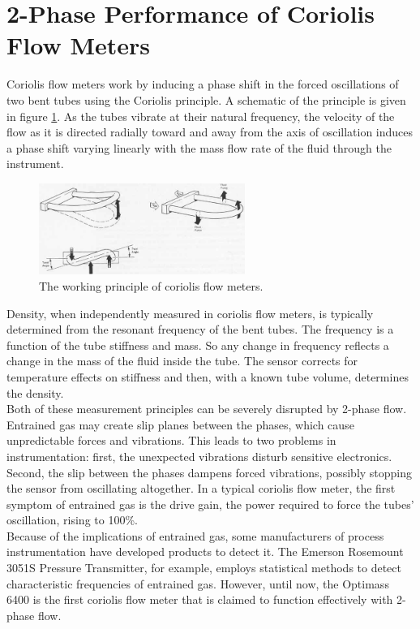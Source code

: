 \documentclass{report}
\begin{document}
\section{2-Phase Performance of Coriolis Flow Meters}
\FloatBarrier
Coriolis flow meters work by inducing a phase shift in the forced oscillations of two bent tubes using the Coriolis principle. A schematic of the principle is given in figure \ref{fig:coriolis}. As the tubes vibrate at their natural frequency, the velocity of the flow as it is directed radially toward and away from the axis of oscillation induces a phase shift varying linearly with the mass flow rate of the fluid through the instrument. \cite{ISO}\cite{O'Banion 2013}  \\
\begin{figure}
\includegraphics[width=0.6\textwidth]{coriolis}
\caption{The working principle of coriolis flow meters.}%
\label{fig:coriolis}
\end{figure}
\FloatBarrier
Density, when independently measured in coriolis flow meters, is typically determined from the resonant frequency of the bent tubes. \cite{ISO}\cite{O'Banion 2013} The frequency is a function of the tube stiffness and mass. So any change in frequency reflects a change in the mass of the fluid inside the tube. The sensor corrects for temperature effects on stiffness and then, with a known tube volume, determines the density. \cite{ISO}\\
Both of these measurement principles can be severely disrupted by 2-phase flow. Entrained gas may create slip planes between the phases, which cause unpredictable forces and vibrations.\cite{ISO}\cite{processArticle}\cite{emerson2Phase} This leads to two problems in instrumentation: first, the unexpected vibrations disturb sensitive electronics. Second, the slip between the phases dampens forced vibrations, possibly stopping the sensor from oscillating altogether. In a typical coriolis flow meter, the first symptom of entrained gas is the drive gain, the power required to force the tubes' oscillation, rising to 100\%. \cite{ISO}\cite{emerson youtube}\\
Because of the implications of entrained gas, some manufacturers of process instrumentation have developed products to detect it. The Emerson Rosemount 3051S Pressure Transmitter, for example, employs statistical methods to detect characteristic frequencies of entrained gas. \cite{emerson EGM} However, until now, the Optimass 6400 is the first coriolis flow meter that is claimed to function effectively with 2-phase flow.
\end{document}
